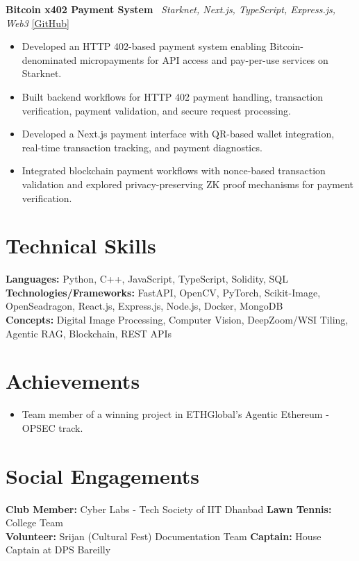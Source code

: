 \documentclass[a4paper,10pt]{article}
\begin{document}
\vspace{3pt}
\textbf{Bitcoin x402 Payment System} \textbar\ \textit{Starknet, Next.js, TypeScript, Express.js, Web3} \hfill \href{https://github.com/BST1807}{[GitHub]}
\begin{itemize}
    \item Developed an HTTP 402-based payment system enabling Bitcoin-denominated micropayments for API access and pay-per-use services on Starknet.
    \item Built backend workflows for HTTP 402 payment handling, transaction verification, payment validation, and secure request processing.
    \item Developed a Next.js payment interface with QR-based wallet integration, real-time transaction tracking, and payment diagnostics.
    \item Integrated blockchain payment workflows with nonce-based transaction validation and explored privacy-preserving ZK proof mechanisms for payment verification.
\end{itemize}

\section{Technical Skills}
\textbf{Languages:} Python, C++, JavaScript, TypeScript, Solidity, SQL \\
\textbf{Technologies/Frameworks:} FastAPI, OpenCV, PyTorch, Scikit-Image, OpenSeadragon, React.js, Express.js, Node.js, Docker, MongoDB \\
\textbf{Concepts:} Digital Image Processing, Computer Vision, DeepZoom/WSI Tiling, Agentic RAG, Blockchain, REST APIs

\section{Achievements}
\begin{itemize}
    \item Team member of a winning project in ETHGlobal’s Agentic Ethereum - OPSEC track.
\end{itemize}

\section{Social Engagements}
\textbf{Club Member:} Cyber Labs - Tech Society of IIT Dhanbad \hfill \textbf{Lawn Tennis:} College Team \\
\textbf{Volunteer:} Srijan (Cultural Fest) Documentation Team \hfill \textbf{Captain:} House Captain at DPS Bareilly
\end{document}
